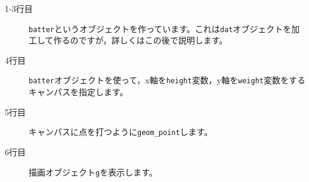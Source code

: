 \begin{description}
	\item[1-3行目] \texttt{batter}というオブジェクトを作っています。これは\texttt{dat}オブジェクトを加工して作るのですが，詳しくはこの後で説明します。
	\item[4行目] \texttt{batter}オブジェクトを使って，x軸を\texttt{height}変数，y軸を\texttt{weight}変数をするキャンパスを指定します。
	\item[5行目] キャンパスに点を打つように\verb|geom_point|します。
	\item[6行目] 描画オブジェクト\texttt{g}を表示します。
\end{description}
